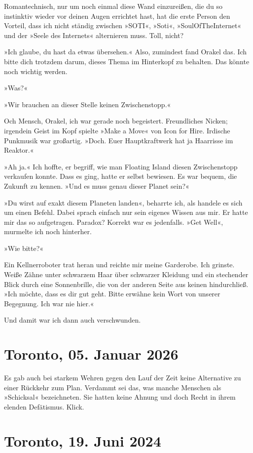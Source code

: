 Romantechnisch, nur um noch einmal diese Wand einzureißen, die du so instinktiv wieder vor deinen Augen errichtet hast, hat die erste Person den Vorteil, dass ich nicht ständig zwischen »SOTI«, »Soti«, »SoulOfTheInternet« und der »Seele des Internets« alternieren muss. Toll, nicht?

»Ich glaube, du hast da etwas übersehen.« Also, zumindest fand Orakel das. Ich bitte dich trotzdem darum, dieses Thema im Hinterkopf zu behalten. Das könnte noch wichtig werden.

»Was?«

»Wir brauchen an dieser Stelle keinen Zwischenstopp.«

Och Mensch, Orakel, ich war gerade noch begeistert. Freundliches Nicken; irgendein Geist im Kopf spielte »Make a Move« von Icon for Hire. Irdische Punkmusik war großartig. »Doch. Euer Hauptkraftwerk hat ja Haarrisse im Reaktor.«

»Ah ja.« Ich hoffte, er begriff, wie man Floating Island diesen Zwischenstopp verkaufen konnte. Dass es ging, hatte er selbst bewiesen. Es war bequem, die Zukunft zu kennen. »Und es muss genau dieser Planet sein?«

»Du wirst auf exakt diesem Planeten landen«, beharrte ich, als handele es sich um einen Befehl. Dabei sprach einfach nur sein eigenes Wissen aus mir. Er hatte mir das so aufgetragen. Paradox? Korrekt war es jedenfalls. »Get Well«, murmelte ich noch hinterher.

»Wie bitte?«

Ein Kellnerroboter trat heran und reichte mir meine Garderobe. Ich grinste. Weiße Zähne unter schwarzem Haar über schwarzer Kleidung und ein stechender Blick durch eine Sonnenbrille, die von der anderen Seite aus keinen hindurchließ. »Ich möchte, dass es dir gut geht. Bitte erwähne kein Wort von unserer Begegnung. Ich war nie hier.«

Und damit war ich dann auch verschwunden.


\chapter{Toronto, 05. Januar 2026}

Es gab auch bei starkem Wehren gegen den Lauf der Zeit keine Alternative zu einer Rückkehr zum Plan. Verdammt sei das, was manche Menschen als »Schicksal« bezeichneten. Sie hatten keine Ahnung und doch Recht in ihrem elenden Defätismus. Klick.


\chapter{Toronto, 19. Juni 2024}

